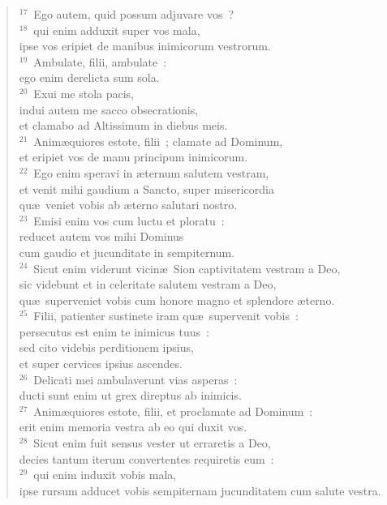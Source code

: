\begin{flushleft}
\begin{verse}
${}^{17}$~Ego autem, quid possum adjuvare vos~?\\
${}^{18}$~qui enim adduxit super vos mala,\\ ipse vos eripiet de manibus inimicorum vestrorum.\\
${}^{19}$~Ambulate, filii, ambulate~:\\ ego enim derelicta sum sola.\\
${}^{20}$~Exui me stola pacis,\\ indui autem me sacco obsecrationis,\\ et clamabo ad Altissimum in diebus meis.\\
${}^{21}$~Anim\ae quiores estote, filii~; clamate ad Dominum,\\ et eripiet vos de manu principum inimicorum.\\
${}^{22}$~Ego enim speravi in \ae ternum salutem vestram,\\ et venit mihi gaudium a Sancto, super misericordia\\ qu\ae\ veniet vobis ab \ae terno salutari nostro.\\
${}^{23}$~Emisi enim vos cum luctu et ploratu~:\\ reducet autem vos mihi Dominus\\ cum gaudio et jucunditate in sempiternum.\\
${}^{24}$~Sicut enim viderunt vicin\ae\ Sion captivitatem vestram a Deo,\\ sic videbunt et in celeritate salutem vestram a Deo,\\ qu\ae\ superveniet vobis cum honore magno et splendore \ae terno.\\
${}^{25}$~Filii, patienter sustinete iram qu\ae\ supervenit vobis~:\\ persecutus est enim te inimicus tuus~:\\ sed cito videbis perditionem ipsius,\\ et super cervices ipsius ascendes.\\
${}^{26}$~Delicati mei ambulaverunt vias asperas~:\\ ducti sunt enim ut grex direptus ab inimicis.\\
${}^{27}$~Anim\ae quiores estote, filii, et proclamate ad Dominum~:\\ erit enim memoria vestra ab eo qui duxit vos.\\
${}^{28}$~Sicut enim fuit sensus vester ut erraretis a Deo,\\ decies tantum iterum convertentes requiretis eum~:\\
${}^{29}$~qui enim induxit vobis mala,\\ ipse rursum adducet vobis sempiternam jucunditatem cum salute vestra.\end{verse}\end{flushleft}


